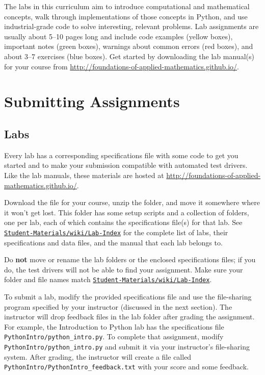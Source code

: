 
The labs in this curriculum aim to introduce computational and mathematical concepts, walk through implementations of those concepts in Python, and use industrial-grade code to solve interesting, relevant problems.
Lab assignments are usually about 5--10 pages long and include code examples (yellow boxes), important notes (green boxes), warnings about common errors (red boxes), and about 3--7 exercises (blue boxes).
Get started by downloading the lab manual(s) for your course from \url{http://foundations-of-applied-mathematics.github.io/}.

\section*{Submitting Assignments} %

\subsection*{Labs}

Every lab has a corresponding specifications file with some code to get you started and to make your submission compatible with automated test drivers.
Like the lab manuals, these materials are hosted at \url{http://foundations-of-applied-mathematics.github.io/}.

Download the  file for your course, unzip the folder, and move it somewhere where it won't get lost.
This folder has some setup scripts and a collection of folders, one per lab, each of which contains the specifications file(s) for that lab.
See \href{https://github.com/Foundations-of-Applied-Mathematics/Student-Materials/wiki/Lab-Index}{\texttt{Student-Materials/wiki/Lab-Index}} for the complete list of labs, their specifications and data files, and the manual that each lab belongs to.

\begin{warn}
Do \textbf{not} move or rename the lab folders or the enclosed specifications files; if you do, the test drivers will not be able to find your assignment.
Make sure your folder and file names match \href{https://github.com/Foundations-of-Applied-Mathematics/Student-Materials/wiki/Lab-Index}{\texttt{Student-Materials/wiki/Lab-Index}}.
\end{warn}

To submit a lab, modify the provided specifications file and use the file-sharing program specified by your instructor (discussed in the next section).
The instructor will drop feedback files in the lab folder after grading the assignment.
For example, the Introduction to Python lab has the specifications file \texttt{PythonIntro/python\_intro.py}.
To complete that assignment, modify \texttt{PythonIntro/python\_intro.py} and submit it via your instructor's file-sharing system.
After grading, the instructor will create a file called \texttt{PythonIntro/PythonIntro\_feedback.txt} with your score and some feedback.

